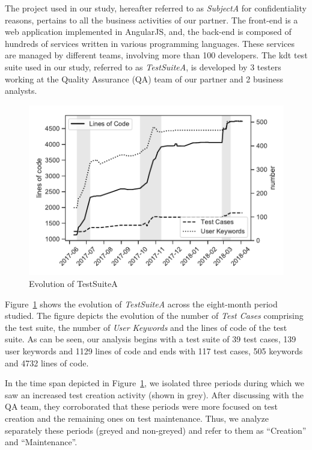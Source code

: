 The project used in our study, hereafter referred to as \emph{SubjectA} for confidentiality reasons, pertains to all the business activities of our partner. The front-end is a web application implemented in AngularJS, and, the back-end is composed of hundreds of services written in various programming languages. These services are managed by different teams, involving more than 100 developers. The \gls{kdt} test suite used in our study, referred to as \emph{TestSuiteA}, is developed by 3 testers working at the Quality Assurance (QA) team of our partner and 2 business analysts.

\begin{figure}[t!]
  \centering
  \includegraphics[width=0.7\columnwidth]{figures/evolution/project_evolution.pdf}
  \caption{Evolution of TestSuiteA}
  \label{fig:project_evolution}%
\end{figure}

Figure~\ref{fig:project_evolution} shows the evolution of \emph{TestSuiteA} across the eight-month period studied. The figure depicts the evolution of the number of \emph{Test Cases} comprising the test suite, the number of \emph{User Keywords} and the lines of code of the test suite. As can be seen, our analysis begins with a test suite of 39 test cases, 139 user keywords and 1129 lines of code and ends with 117 test cases, 505 keywords and 4732 lines of code.

In the time span depicted in Figure~\ref{fig:project_evolution}, we isolated three periods during which we saw an increased test creation activity (shown in grey). After discussing with the QA team, they corroborated that these periods were more focused on test creation and the remaining ones on test maintenance. Thus, we analyze separately these periods (greyed and non-greyed) and refer to them as ``Creation'' and ``Maintenance''.